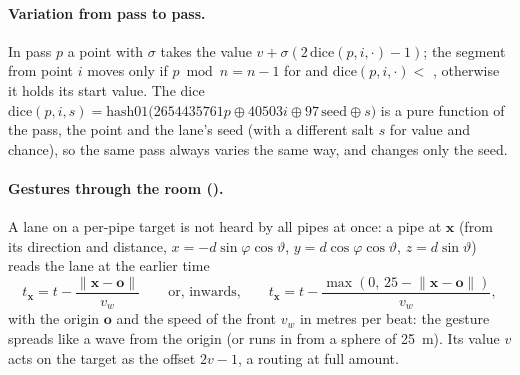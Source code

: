 \paragraph{Variation from pass to pass.} In pass $p$ a point with  $\sigma$ takes the value
$v + \sigma(2\,\mathrm{dice}(p,i,\cdot)-1)$; the segment from point $i$ moves only if $p \bmod n = n-1$ for  and $\mathrm{dice}(p,i,\cdot) < $ , otherwise it holds its start value. The dice
$\mathrm{dice}(p,i,s) = \mathrm{hash01}\bigl(2654435761p \oplus 40503i \oplus 97\,\mathrm{seed}\oplus s\bigr)$ is a pure
function of the pass, the point and the lane's seed (with a different salt $s$ for value and chance), so the same pass
always varies the same way, and  changes only the seed.

\paragraph{Gestures through the room ().} A lane on a per-pipe target is not heard by all pipes at
once: a pipe at $\mathbf x$ (from its direction and distance, $x = -d\sin\varphi\cos\vartheta$,
$y = d\cos\varphi\cos\vartheta$, $z = d\sin\vartheta$) reads the lane at the earlier time
\begin{equation}
  t_\mathbf{x} = t - \frac{\lVert\mathbf x - \mathbf o\rVert}{v_w}\qquad\text{or, inwards,}\qquad
  t_\mathbf{x} = t - \frac{\max(0,\,25 - \lVert\mathbf x-\mathbf o\rVert)}{v_w},
\end{equation}
with the origin $\mathbf o$ and the speed of the front $v_w$ in metres per beat: the gesture spreads like a wave from
the origin (or runs in from a sphere of \SI{25}{m}). Its value $v$ acts on the target as the offset $2v-1$, a routing at
full amount.

